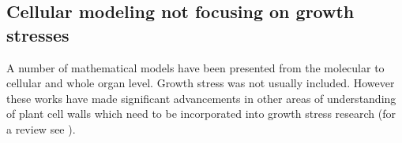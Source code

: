 \subsection{Cellular modeling not focusing on growth stresses}
A number of mathematical models have been presented from the
molecular to cellular and whole organ level. Growth stress was not usually included.
However these works have made significant advancements in other areas of
understanding of plant cell walls which need to be incorporated into growth stress research (for a review see \cite{ISI:000261731700022}).
